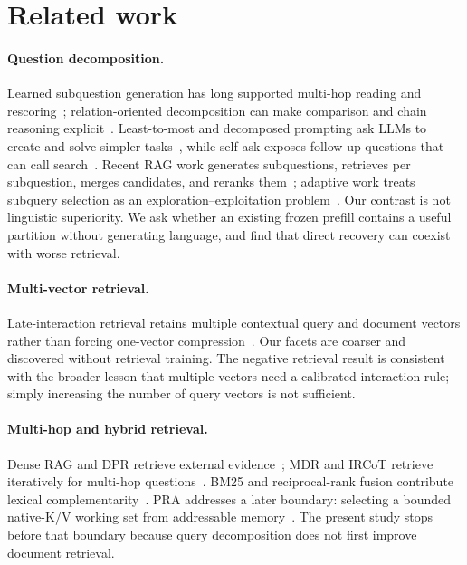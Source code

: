 \documentclass[11pt]{article}
\begin{document}
\section{Related work}
\paragraph{Question decomposition.}
Learned subquestion generation has long supported multi-hop reading and rescoring~\cite{min2019decomposition}; relation-oriented decomposition can make comparison and chain reasoning explicit~\cite{fu2021decomposing}. Least-to-most and decomposed prompting ask LLMs to create and solve simpler tasks~\cite{zhou2023least,khot2023decomposed}, while self-ask exposes follow-up questions that can call search~\cite{press2023compositionality}. Recent RAG work generates subquestions, retrieves per subquestion, merges candidates, and reranks them~\cite{ammann2025question}; adaptive work treats subquery selection as an exploration--exploitation problem~\cite{petcu2026query}. Our contrast is not linguistic superiority. We ask whether an existing frozen prefill contains a useful partition without generating language, and find that direct recovery can coexist with worse retrieval.

\paragraph{Multi-vector retrieval.}
Late-interaction retrieval retains multiple contextual query and document vectors rather than forcing one-vector compression~\cite{khattab2020colbert}. Our facets are coarser and discovered without retrieval training. The negative retrieval result is consistent with the broader lesson that multiple vectors need a calibrated interaction rule; simply increasing the number of query vectors is not sufficient.

\paragraph{Multi-hop and hybrid retrieval.}
Dense RAG and DPR retrieve external evidence~\cite{lewis2020rag,karpukhin2020dpr}; MDR and IRCoT retrieve iteratively for multi-hop questions~\cite{xiong2021mdr,trivedi2023ircot}. BM25 and reciprocal-rank fusion contribute lexical complementarity~\cite{robertson2009bm25,cormack2009rrf}. PRA addresses a later boundary: selecting a bounded native-K/V working set from addressable memory~\cite{simao2026pra,simao2026hf}. The present study stops before that boundary because query decomposition does not first improve document retrieval.
\end{document}

